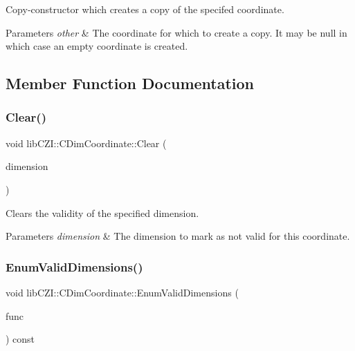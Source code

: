Copy-\/constructor which creates a copy of the specifed coordinate.


\begin{DoxyParams}{Parameters}
{\em other} & The coordinate for which to create a copy. It may be null in which case an empty coordinate is created. \\
\hline
\end{DoxyParams}


\subsection{Member Function Documentation}
\mbox{\label{classlib_c_z_i_1_1_c_dim_coordinate_abfffd501e6cb4818a4b0454920b866ef}} 
\subsubsection{\texorpdfstring{Clear()}{Clear()}}
{\footnotesize\ttfamily void lib\+C\+Z\+I\+::\+C\+Dim\+Coordinate\+::\+Clear (\begin{DoxyParamCaption}\item[{\hyperlink{namespacelib_c_z_i_a55049658acf59d0eddfaebcad16df424}{lib\+C\+Z\+I\+::\+Dimension\+Index}}]{dimension }\end{DoxyParamCaption})\hspace{0.3cm}{\ttfamily [inline]}}

Clears the validity of the specified dimension.


\begin{DoxyParams}{Parameters}
{\em dimension} & The dimension to mark as \textquotesingle{}not valid for this coordinate\textquotesingle{}. \\
\hline
\end{DoxyParams}
\mbox{\label{classlib_c_z_i_1_1_c_dim_coordinate_a65d3104fbc171cdab0cd53616df13f8e}} 
\subsubsection{\texorpdfstring{Enum\+Valid\+Dimensions()}{EnumValidDimensions()}}
{\footnotesize\ttfamily void lib\+C\+Z\+I\+::\+C\+Dim\+Coordinate\+::\+Enum\+Valid\+Dimensions (\begin{DoxyParamCaption}\item[{std\+::function$<$ bool(\hyperlink{namespacelib_c_z_i_a55049658acf59d0eddfaebcad16df424}{lib\+C\+Z\+I\+::\+Dimension\+Index} dim, int value)$>$}]{func }\end{DoxyParamCaption}) const\hspace{0.3cm}{\ttfamily [inline]}}


